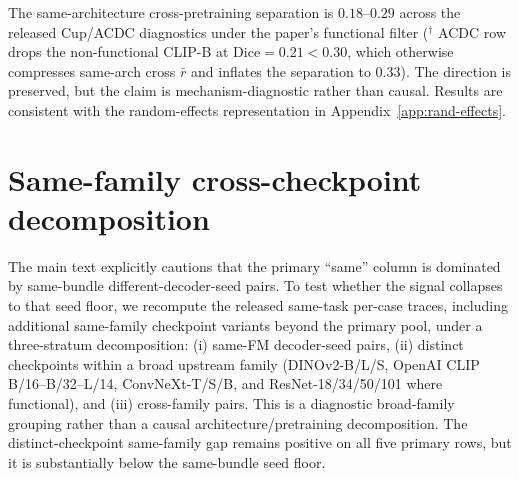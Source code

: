 The same-architecture cross-pretraining separation is $0.18$--$0.29$ across the released Cup/ACDC diagnostics under the paper's functional filter ($^{\dag}$ ACDC row drops the non-functional CLIP-B at $\text{Dice}{=}0.21{<}0.30$, which otherwise compresses same-arch cross $\bar r$ and inflates the separation to $0.33$). The direction is preserved, but the claim is mechanism-diagnostic rather than causal. Results are consistent
with the random-effects representation in Appendix~\ref{app:rand-effects}.

\section{Same-family cross-checkpoint decomposition}
\label{app:cross-checkpoint}

The main text explicitly cautions that the primary ``same'' column is
dominated by same-bundle different-decoder-seed pairs. To test whether the signal
collapses to that seed floor, we recompute the released same-task per-case traces, including additional same-family checkpoint variants beyond the primary pool, under a
three-stratum decomposition: (i) same-FM decoder-seed pairs, (ii) distinct
checkpoints within a broad upstream family (DINOv2-B/L/S, OpenAI CLIP
B/16--B/32--L/14, ConvNeXt-T/S/B, and ResNet-18/34/50/101 where
functional), and (iii) cross-family
pairs. This is a diagnostic broad-family grouping rather than a causal
architecture/pretraining decomposition. The distinct-checkpoint same-family
gap remains positive on all five primary rows, but it is substantially below
the same-bundle seed floor.

